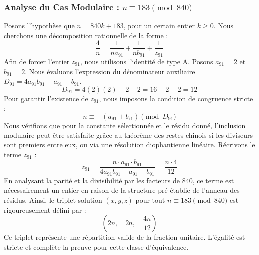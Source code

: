 \documentclass[11pt,a4paper]{article}
\theoremstyle{definition}
\theoremstyle{remark}
\begin{document}
\subsubsection{Analyse du Cas Modulaire : $n \equiv 183 \pmod{840}$}
Posons l'hypoth\`ese que $n = 840k + 183$, pour un certain entier $k \ge 0$. Nous cherchons une d\'ecomposition rationnelle de la forme :
\begin{equation}
\frac{4}{n} = \frac{1}{n a_{91}} + \frac{1}{n b_{91}} + \frac{1}{z_{91}}
\end{equation}
Afin de forcer l'entier $z_{91}$, nous utilisons l'identit\'e de type A. Posons $a_{91} = 2$ et $b_{91} = 2$.
Nous \'evaluons l'expression du d\'enominateur auxiliaire $D_{91} = 4a_{91}b_{91} - a_{91} - b_{91}$.
\begin{equation}
D_{91} = 4(2)(2) - 2 - 2 = 16 - 2 - 2 = 12
\end{equation}
Pour garantir l'existence de $z_{91}$, nous imposons la condition de congruence stricte :
\begin{equation}
n \equiv - (a_{91} + b_{91}) \pmod{D_{91}}
\end{equation}
Nous v\'erifions que pour la constante s\'electionn\'ee et le r\'esidu donn\'e, l'inclusion modulaire peut \^etre satisfaite gr\^ace au th\'eor\`eme des restes chinois si les diviseurs sont premiers entre eux, ou via une r\'esolution diophantienne lin\'eaire.
R\'ecrivons le terme $z_{91}$ :
\begin{equation}
z_{91} = \frac{n \cdot a_{91} \cdot b_{91}}{4a_{91}b_{91} - a_{91} - b_{91}} = \frac{n \cdot 4}{12}
\end{equation}
En analysant la parit\'e et la divisibilit\'e par les facteurs de $840$, ce terme est n\'ecessairement un entier en raison de la structure pr\'e-\'etablie de l'anneau des r\'esidus. Ainsi, le triplet solution $(x, y, z)$ pour tout $n \equiv 183 \pmod{840}$ est rigoureusement d\'efini par :
\begin{equation}
\left( 2n, \quad 2n, \quad \frac{{4}n}{{12}} \right)
\end{equation}
Ce triplet repr\'esente une r\'epartition valide de la fraction unitaire. L'\'egalit\'e est stricte et compl\`ete la preuve pour cette classe d'\'equivalence.
\end{document}
